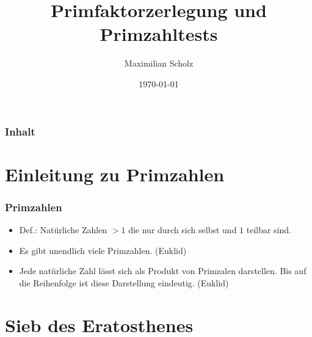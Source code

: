 \documentclass[mathserif, compress]{beamer}
\title{Primfaktorzerlegung und Primzahltests}    %
\author{Maximilian Scholz}                 %
\institute{Proseminar Mathematik}      %
\date{\today}                    %
\begin{document}
\begin{frame}
  \titlepage
\end{frame}

\section[]{}

\begin{frame}
  \frametitle{Inhalt}
  \tableofcontents
\end{frame}

\section{Einleitung zu Primzahlen}
  
\begin{frame}
  \frametitle{Primzahlen}
  \begin{itemize}
    \item Def.: Nat\"urliche Zahlen $> 1$ die nur durch sich selbst und $1$ teilbar sind.
      \vspace{3mm}
    \item Es gibt unendlich viele Primzahlen. (Euklid)
      \vspace{3mm}
    \item Jede nat\"urliche Zahl l\"asst sich als Produkt von Primzalen darstellen. 
	  Bis auf die Reihenfolge ist diese Darstellung eindeutig. (Euklid)
  \end{itemize}
\end{frame}

\section{Sieb des Eratosthenes}
\end{document}
